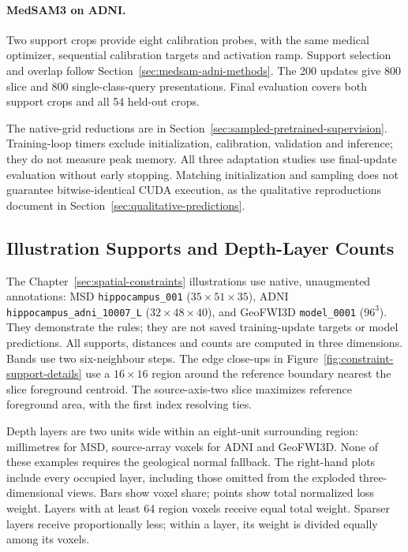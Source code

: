 \documentclass[12pt,a4paper]{article}
\begin{document}
\paragraph{MedSAM3 on ADNI.}\label{sec:medsam-adni-methods-details}
Two support crops provide eight calibration probes, with the same
medical optimizer, sequential calibration targets and activation ramp.
Support selection and overlap follow
Section~\ref{sec:medsam-adni-methods}. The 200 updates give 800 slice
and 800 single-class-query presentations. Final evaluation covers both
support crops and all 54 held-out crops.

The native-grid reductions are in
Section~\ref{sec:sampled-pretrained-supervision}. Training-loop timers
exclude initialization, calibration, validation and inference; they do
not measure peak memory. All three adaptation studies use final-update
evaluation without early stopping. Matching initialization and sampling
does not guarantee bitwise-identical CUDA execution, as the qualitative
reproductions document in Section~\ref{sec:qualitative-predictions}.

\subsection{Illustration Supports and Depth-Layer Counts}
\label{sec:dataset-constraint-examples}

The Chapter~\ref{sec:spatial-constraints} illustrations use native,
unaugmented annotations: MSD \texttt{hippocampus\_001} ($35\times51\times35$),
ADNI \texttt{hippocampus\_adni\_10007\_L} ($32\times48\times40$),
and GeoFWI3D \texttt{model\_0001} ($96^3$). They demonstrate the rules;
they are not saved training-update targets or model predictions.
All supports, distances and counts are computed in three dimensions.
Bands use two six-neighbour steps. The edge close-ups in
Figure~\ref{fig:constraint-support-details} use a $16\times16$ region
around the reference boundary nearest the slice foreground centroid.
The source-axis-two slice maximizes reference foreground area, with
the first index resolving ties.

Depth layers are two units wide within an eight-unit surrounding region:
millimetres for MSD, source-array voxels for ADNI and GeoFWI3D. None of
these examples requires the geological normal fallback. The right-hand
plots include every occupied layer, including those omitted from the
exploded three-dimensional views. Bars show voxel share; points show
total normalized loss weight. Layers with at least 64 region voxels
receive equal total weight. Sparser layers receive proportionally less;
within a layer, its weight is divided equally among its voxels.
\end{document}
